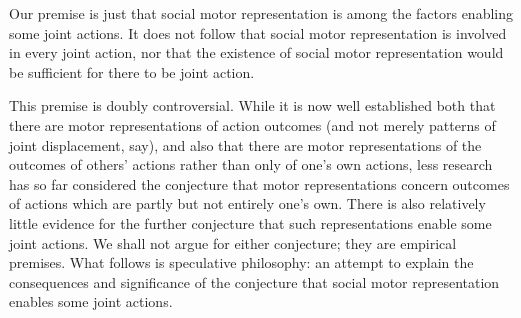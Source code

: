 \documentclass[12pt,\papersize]{extarticle}
\begin{document}
Our premise is just that social motor representation is among the factors enabling some joint actions.
It does not follow that social motor representation is involved in every joint action,
nor that the existence of social motor representation would be sufficient for there to be joint action.

This premise is doubly controversial.
While it is now well established both that there are motor representations of action outcomes (and not merely patterns of joint displacement, say), and also that there are motor representations of the outcomes of others' actions rather than only of one's own actions,
less research has so far considered the conjecture that motor representations concern outcomes of actions which are partly but not entirely one's own.
There is also relatively little evidence for the further conjecture that such representations enable some joint actions.
We shall not argue for either conjecture; they are empirical premises.  
What follows is speculative philosophy: an attempt to explain the consequences and significance of the conjecture that social motor representation enables some joint actions.
\end{document}
